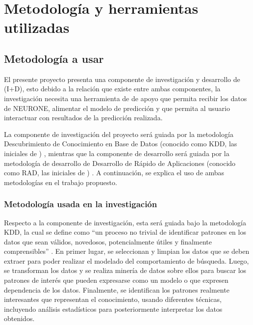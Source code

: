\section{Metodología y herramientas utilizadas}
\label{sec:metodologia-herramientas}


\subsection{Metodología a usar}
\label{subsec:metodologia}

El presente proyecto presenta una componente de investigación y desarrollo de  (I+D), esto debido a la relación que existe entre ambas componentes, la investigación necesita una herramienta de  de apoyo que permita recibir los datos de NEURONE, alimentar el modelo de predicción y que permita al usuario interactuar con resultados de la predicción realizada.

La componente de investigación del proyecto será guiada por la metodología Descubrimiento de Conocimiento en Base de Datos (conocido como KDD, las iniciales de ) \parencite{fayyad1996data}, mientras que la componente de desarrollo será guiada por la metodología de desarrollo de  Desarrollo de Rápido de Aplicaciones (conocido como RAD, las iniciales de ) \parencite{martin1991rapid}. A continuación, se explica el uso de ambas metodologías en el trabajo propuesto.

\subsubsection*{Metodología usada en la investigación}
Respecto a la componente de investigación, esta será guiada bajo la metodología KDD, la cual se define como “un proceso no trivial de identificar patrones en los datos que sean válidos, novedosos, potencialmente útiles y finalmente comprensibles” \parencite[p.~5]{fayyad1996data}. En primer lugar, se seleccionan y limpian los datos que se deben extraer para poder realizar el modelado del comportamiento de búsqueda. Luego, se transforman los datos y se realiza minería de datos sobre ellos para buscar los patrones de interés que pueden expresarse como un modelo o que expresen dependencia de los datos. Finalmente, se identifican los patrones realmente interesantes que representan el conocimiento, usando diferentes técnicas, incluyendo análisis estadísticos para posteriormente interpretar los datos obtenidos.


